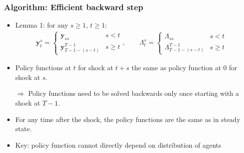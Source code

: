 \documentclass[english,xcolor=svgnames]{beamer}
\begin{document}
\begin{frame}
    \frametitle{Algorithm: Efficient backward step}
    \begin{itemize}
    	\item Lemma 1: for any $s\ge 1$, $t\ge 1$:
    	\begin{align*}
    		\bm{y}_t^s = \begin{cases}
    			\bm{y}_{ss} & s<t \\
    			\bm{y}_{T-1-(s-t)}^{T-1} & s \ge t
    		\end{cases},\qquad  \Lambda_t^s = \begin{cases}
    			 \Lambda_{ss} & s<t \\
    			 \Lambda_{T-1-(s-t)}^{T-1} & s \ge t
    		\end{cases}
    	\end{align*}
    	\item Policy functions at $t$ for shock at $t+s$ the same as policy function at $0$ for shock at $s$. 
        \item[$\Rightarrow$] Policy functions need to be solved backwards only once starting with a shock at $T-1$.
%        
        \item For any time after the shock, the policy functions are the same as in steady state.
        \item Key: policy function cannot directly depend on distribution of agents
      \end{itemize}
\end{frame}
\end{document}
